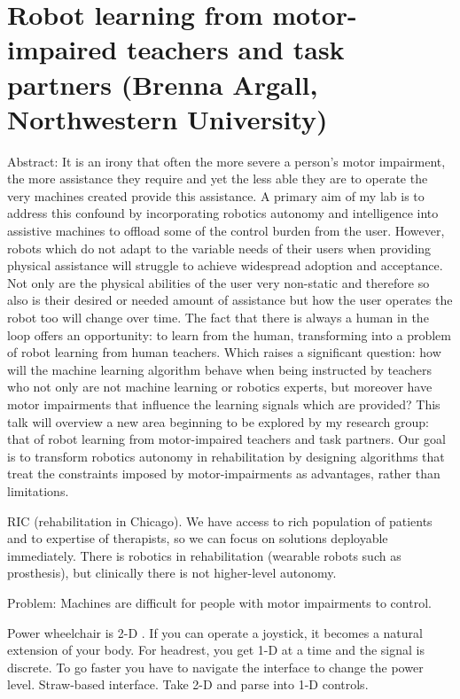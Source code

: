 \section{Robot learning from motor-impaired teachers and task partners (Brenna Argall, Northwestern University)}

Abstract:  
It is an irony that often the more severe a person's motor impairment, the more assistance they require and yet the less able they are to operate the very machines created provide this assistance. A primary aim of my lab is to address this confound by incorporating robotics autonomy and intelligence into assistive machines to offload some of the control burden from the user. However, robots which do not adapt to the variable needs of their users when providing physical assistance will struggle to achieve widespread adoption and acceptance. Not only are the physical abilities of the user very non-static and therefore so also is their desired or needed amount of assistance but how the user operates the robot too will change over time. The fact that there is always a human in the loop offers an opportunity: to learn from the human, transforming into a problem of robot learning from human teachers. Which raises a significant question: how will the machine learning algorithm behave when being instructed by teachers who not only are not machine learning or robotics experts, but moreover have motor impairments that influence the learning signals which are provided? This talk will overview a new area beginning to be explored by my research group: that of robot learning from motor-impaired teachers and task partners. Our goal is to transform robotics autonomy in rehabilitation by designing algorithms that treat the constraints imposed by motor-impairments as advantages, rather than limitations.

RIC (rehabilitation in Chicago). We have access to rich population of patients and to  expertise of therapists, so we can focus on solutions deployable immediately.
There is robotics in rehabilitation (wearable robots such as prosthesis), but clinically there is not higher-level autonomy.

Problem: Machines are difficult for people with motor impairments to control.

Power wheelchair is 2-D . If you can operate a joystick, it becomes a natural extension of your body. For headrest, you get 1-D at a time and the signal is discrete. To go faster you have to navigate the interface to change the power level. Straw-based interface.
Take 2-D and parse into 1-D controls.

